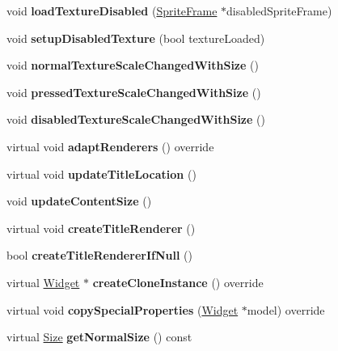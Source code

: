\begin{DoxyCompactItemize}
\mbox{\label{classui_1_1Button_aba7e34879fa99df7a64f3a312b30d32d}} 
void {\bfseries load\+Texture\+Disabled} (\hyperlink{classSpriteFrame}{Sprite\+Frame} $\ast$disabled\+Sprite\+Frame)
\item 
\mbox{\label{classui_1_1Button_a0b48c4a2f83ba5d34eb3a4a11ecad0bb}} 
void {\bfseries setup\+Disabled\+Texture} (bool texture\+Loaded)
\item 
\mbox{\label{classui_1_1Button_a9e3c0c6e8d4e272d4912831876ee78a4}} 
void {\bfseries normal\+Texture\+Scale\+Changed\+With\+Size} ()
\item 
\mbox{\label{classui_1_1Button_a702f8a1d86748a869cccb32a418c8d93}} 
void {\bfseries pressed\+Texture\+Scale\+Changed\+With\+Size} ()
\item 
\mbox{\label{classui_1_1Button_a1303de6f2594fa60ac27635328dcfb3d}} 
void {\bfseries disabled\+Texture\+Scale\+Changed\+With\+Size} ()
\item 
\mbox{\label{classui_1_1Button_a2f151ddffdfbbf7e14d30a573a616bba}} 
virtual void {\bfseries adapt\+Renderers} () override
\item 
\mbox{\label{classui_1_1Button_aa4ecaebb1c08308a122b3ced8993d647}} 
virtual void {\bfseries update\+Title\+Location} ()
\item 
\mbox{\label{classui_1_1Button_a5e3a5166e6f4d98c6397b09b43f92c38}} 
void {\bfseries update\+Content\+Size} ()
\item 
\mbox{\label{classui_1_1Button_a6b700bd32fa588bcb840a103a08f9df7}} 
virtual void {\bfseries create\+Title\+Renderer} ()
\item 
\mbox{\label{classui_1_1Button_a9a0fbbf1dddb36b48bcb333a4eca0cec}} 
bool {\bfseries create\+Title\+Renderer\+If\+Null} ()
\item 
\mbox{\label{classui_1_1Button_afa36ba74f279ee222e30a25500aafea8}} 
virtual \hyperlink{classui_1_1Widget}{Widget} $\ast$ {\bfseries create\+Clone\+Instance} () override
\item 
\mbox{\label{classui_1_1Button_a43f0ef1081ed51b41f205f74ac7d1ca0}} 
virtual void {\bfseries copy\+Special\+Properties} (\hyperlink{classui_1_1Widget}{Widget} $\ast$model) override
\item 
\mbox{\label{classui_1_1Button_ab2484a1d55debe48a794d8cb5effcb34}} 
virtual \hyperlink{classSize}{Size} {\bfseries get\+Normal\+Size} () const
\end{DoxyCompactItemize}
